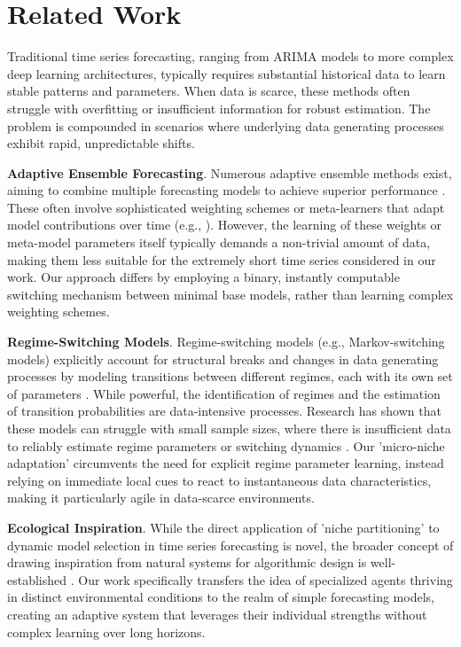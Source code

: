 \documentclass[11pt,letterpaper]{article}
\begin{document}
\section{Related Work}

Traditional time series forecasting, ranging from ARIMA models to more complex deep learning architectures, typically requires substantial historical data to learn stable patterns and parameters. When data is scarce, these methods often struggle with overfitting or insufficient information for robust estimation. The problem is compounded in scenarios where underlying data generating processes exhibit rapid, unpredictable shifts.

\textbf{Adaptive Ensemble Forecasting}. Numerous adaptive ensemble methods exist, aiming to combine multiple forecasting models to achieve superior performance \cite{article5, article6}. These often involve sophisticated weighting schemes or meta-learners that adapt model contributions over time (e.g., \cite{article7}). However, the learning of these weights or meta-model parameters itself typically demands a non-trivial amount of data, making them less suitable for the extremely short time series considered in our work. Our approach differs by employing a binary, instantly computable switching mechanism between minimal base models, rather than learning complex weighting schemes.

\textbf{Regime-Switching Models}. Regime-switching models (e.g., Markov-switching models) explicitly account for structural breaks and changes in data generating processes by modeling transitions between different regimes, each with its own set of parameters \cite{article1}. While powerful, the identification of regimes and the estimation of transition probabilities are data-intensive processes. Research has shown that these models can struggle with small sample sizes, where there is insufficient data to reliably estimate regime parameters or switching dynamics \cite{article4}. Our 'micro-niche adaptation' circumvents the need for explicit regime parameter learning, instead relying on immediate local cues to react to instantaneous data characteristics, making it particularly agile in data-scarce environments.

\textbf{Ecological Inspiration}. While the direct application of 'niche partitioning' to dynamic model selection in time series forecasting is novel, the broader concept of drawing inspiration from natural systems for algorithmic design is well-established \cite{article8}. Our work specifically transfers the idea of specialized agents thriving in distinct environmental conditions to the realm of simple forecasting models, creating an adaptive system that leverages their individual strengths without complex learning over long horizons.
\end{document}
